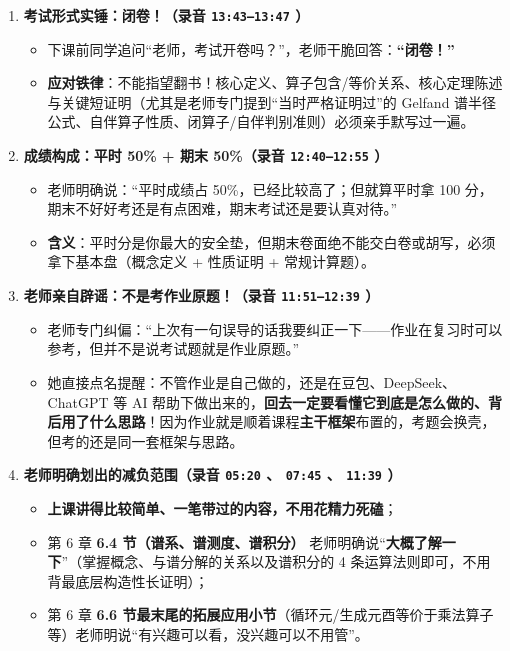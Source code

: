 \documentclass[11pt,a4paper]{article}
\let\oldtexttt\texttt
\renewcommand{\texttt}[1]{%
  \colorbox{CodeBg}{\oldtexttt{\color{AccentMain}#1}}%
}
\providecommand{\tightlist}{\setlength{\itemsep}{2pt}\setlength{\parskip}{0pt}}
\begin{document}
\begin{enumerate}
\def\labelenumi{\arabic{enumi}.}
\tightlist
\item
  \textbf{考试形式实锤：闭卷！（录音 \texttt{13:43–13:47}）}

  \begin{itemize}
  \tightlist
  \item
    下课前同学追问``老师，考试开卷吗？''，老师干脆回答：\textbf{``闭卷！''}
  \item
    \textbf{应对铁律}：不能指望翻书！核心定义、算子包含/等价关系、核心定理陈述与关键短证明（尤其是老师专门提到``当时严格证明过''的 Gelfand 谱半径公式、自伴算子性质、闭算子/自伴判别准则）必须亲手默写过一遍。
  \end{itemize}
\item
  \textbf{成绩构成：平时 50\% + 期末 50\%（录音 \texttt{12:40–12:55}）}

  \begin{itemize}
  \tightlist
  \item
    老师明确说：``平时成绩占 50\%，已经比较高了；但就算平时拿 100 分，期末不好好考还是有点困难，期末考试还是要认真对待。''
  \item
    \textbf{含义}：平时分是你最大的安全垫，但期末卷面绝不能交白卷或胡写，必须拿下基本盘（概念定义 + 性质证明 + 常规计算题）。
  \end{itemize}
\item
  \textbf{老师亲自辟谣：不是考作业原题！（录音 \texttt{11:51–12:39}）}

  \begin{itemize}
  \tightlist
  \item
    老师专门纠偏：``上次有一句误导的话我要纠正一下——作业在复习时可以参考，但并不是说考试题就是作业原题。''
  \item
    她直接点名提醒：不管作业是自己做的，还是在豆包、DeepSeek、ChatGPT 等 AI 帮助下做出来的，\textbf{回去一定要看懂它到底是怎么做的、背后用了什么思路}！因为作业就是顺着课程\textbf{主干框架}布置的，考题会换壳，但考的还是同一套框架与思路。
  \end{itemize}
\item
  \textbf{老师明确划出的减负范围（录音 \texttt{05:20}、\texttt{07:45}、\texttt{11:39}）}

  \begin{itemize}
  \tightlist
  \item
    \textbf{上课讲得比较简单、一笔带过的内容，不用花精力死磕}；
  \item
    第 6 章 \textbf{6.4 节（谱系、谱测度、谱积分）} 老师明确说``\textbf{大概了解一下}''（掌握概念、与谱分解的关系以及谱积分的 4 条运算法则即可，不用背最底层构造性长证明）；
  \item
    第 6 章 \textbf{6.6 节最末尾的拓展应用小节}（循环元/生成元酉等价于乘法算子等）老师明说``有兴趣可以看，没兴趣可以不用管''。
  \end{itemize}
\end{enumerate}
\end{document}
